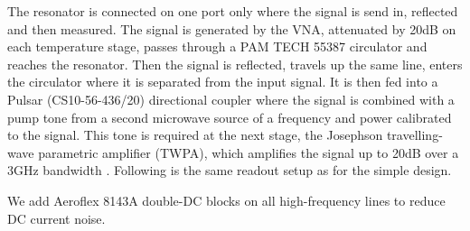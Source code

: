 The resonator is connected on one port only where the signal is send in, reflected and then measured. 
The signal is generated by the VNA, attenuated by 20dB on each temperature stage, passes through a PAM TECH 55387 circulator and reaches the resonator. Then the signal is reflected, travels up the same line, enters the circulator where it is separated from the input signal. It is then fed into a Pulsar (CS10-56-436/20) directional coupler where the signal is combined with a pump tone from a second microwave source of a frequency and power calibrated to the signal. This tone is required at the next stage, the Josephson travelling-wave parametric amplifier (TWPA), which amplifies the signal up to 20dB over a 3GHz bandwidth \cite{Macklin2015}. Following is the same readout setup as for the simple design. 

We add Aeroflex 8143A double-DC blocks on all high-frequency lines to reduce DC current noise. 





